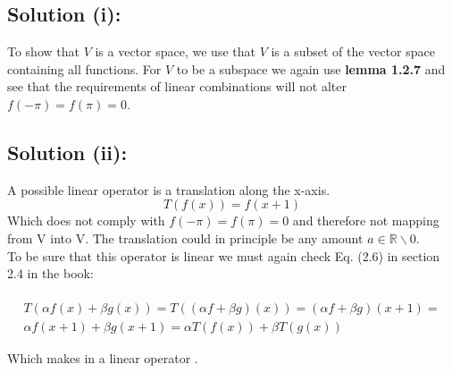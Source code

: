 \documentclass{article}
\begin{document}
\subsection*{Solution (i):}

To show that $V$ is a vector space, we use that $V$ is a subset of the vector space containing all functions. For $V$ to be a subspace we again use \textbf{lemma 1.2.7} and see that the requirements of linear combinations will not alter $f(-\pi)=f(\pi)=0$. 

\subsection*{Solution (ii):}
A possible linear operator is a translation along the x-axis. 
\begin{equation*}
    T(f(x)) = f(x+1)
\end{equation*}
Which does not comply with $f(-\pi)=f(\pi)=0$ and therefore not mapping from V into V. The translation could in principle be any amount $a \in \mathbb{R} \backslash 0$.
\\

To be sure that this operator is linear we must again check Eq. (2.6) in section 2.4 in the book:\\
\\
\begin{gather*}
    T(\alpha f(x) + \beta g(x)) = T((\alpha f + \beta g) (x)) = (\alpha f + \beta g) (x+1) = \\
    \alpha f(x+1) + \beta g(x+1) = \alpha T(f(x)) + \beta T(g(x))
\end{gather*}

Which makes in a linear operator \checkmark. 
\end{document}
